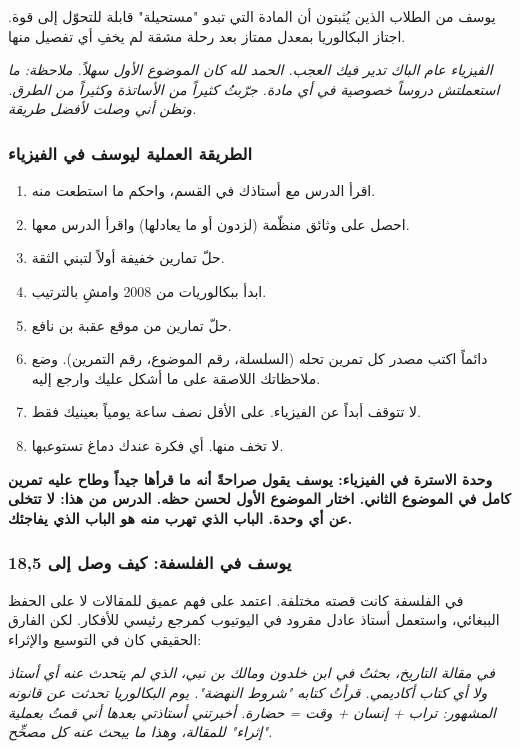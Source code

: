 \documentclass[12pt,a4paper]{book}
\newcommand{\quoteAr}[1]{%
	\begin{myquote}
		\itshape #1
	\end{myquote}
}
\newcommand{\importantAr}[1]{%
	\begin{important}
		\bfseries #1
	\end{important}
}
\begin{document}
يوسف من الطلاب الذين يُثبتون أن المادة التي تبدو "مستحيلة" قابلة للتحوّل إلى قوة. اجتاز البكالوريا بمعدل ممتاز بعد رحلة مشقة لم يخفِ أي تفصيل منها.

\quoteAr{الفيزياء عام الباك تدير فيك العجب. الحمد لله كان الموضوع الأول سهلاً. ملاحظة: ما استعملتش دروساً خصوصية في أي مادة. جرّبتُ كثيراً من الأساتذة وكثيراً من الطرق. ونظن أني وصلت لأفضل طريقة.}

\subsubsection*{الطريقة العملية ليوسف في الفيزياء}

\begin{enumerate}
	\item اقرأ الدرس مع أستاذك في القسم، واحكم ما استطعت منه.
	\item احصل على وثائق منظّمة (لزدون أو ما يعادلها) واقرأ الدرس معها.
	\item حلّ تمارين خفيفة أولاً لتبني الثقة.
	\item ابدأ ببكالوريات من 2008 وامشِ بالترتيب.
	\item حلّ تمارين من موقع عقبة بن نافع.
	\item دائماً اكتب مصدر كل تمرين تحله (السلسلة، رقم الموضوع، رقم التمرين). وضع ملاحظاتك اللاصقة على ما أشكل عليك وارجع إليه.
	\item لا تتوقف أبداً عن الفيزياء. على الأقل نصف ساعة يومياً بعينيك فقط.
	\item لا تخف منها. أي فكرة عندك دماغ تستوعبها.
\end{enumerate}

\importantAr{وحدة الاسترة في الفيزياء: يوسف يقول صراحةً أنه ما قرأها جيداً وطاح عليه تمرين كامل في الموضوع الثاني. اختار الموضوع الأول لحسن حظه. الدرس من هذا: لا تتخلى عن أي وحدة. الباب الذي تهرب منه هو الباب الذي يفاجئك.}


\subsubsection*{يوسف في الفلسفة: كيف وصل إلى 18,5}

في الفلسفة كانت قصته مختلفة. اعتمد على فهم عميق للمقالات لا على الحفظ الببغائي، واستعمل أستاذ عادل مقرود في اليوتيوب كمرجع رئيسي للأفكار. لكن الفارق الحقيقي كان في التوسيع والإثراء:

\quoteAr{في مقالة التاريخ، بحثتُ في ابن خلدون ومالك بن نبي، الذي لم يتحدث عنه أي أستاذ ولا أي كتاب أكاديمي. قرأتُ كتابه "شروط النهضة". يوم البكالوريا تحدثت عن قانونه المشهور: تراب + إنسان + وقت = حضارة. أخبرتني أستاذتي بعدها أني قمتُ بعملية "إثراء" للمقالة، وهذا ما يبحث عنه كل مصحِّح.}
\end{document}
